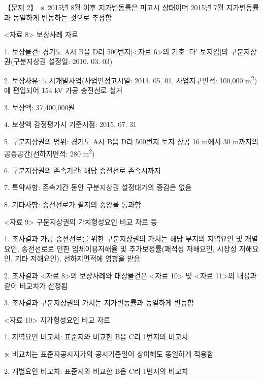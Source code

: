 \begin{longquestion}{【문제 2】}
※ 2015년 8월 이후 지가변동률은 미고시 상태이며 2015년 7월 지가변동률과 동일하게 변동하는 것으로 추정함 \par
<자료 8> 보상사례 자료 \par
1. 보상물건: 경기도 A시 B읍 D리 500번지[<자료 6>의 기호 ‘다’ 토지임]의 구분지상권(구분지상권 설정일: 2010. 03. 03) \par
2. 보상사유: 도시개발사업(사업인정고시일: 2013. 05. 01, 사업지구면적: 100,000 m\textsuperscript{2})에 편입되어 154 kV 가공 송전선로 철거 \par
3. 보상액: 37,400,000원 \par
4. 보상액 감정평가시 기준시점: 2015. 07. 31 \par
5. 구분지상권의 범위: 경기도 A시 B읍 D리 500번지 토지 상공 16 m에서 30 m까지의 공중공간(선하지면적: 280 m\textsuperscript{2}) \par
6. 구분지상권의 존속기간: 해당 송전선로 존속시까지 \par
7. 특약사항: 존속기간 동안 구분지상권 설정대가의 증감은 없음 \par
8. 기타사항: 송전선로가 필지의 중앙을 통과함 \par
<자료 9> 구분지상권의 가치형성요인 비교 자료 등 \par
1. 조사결과 가공 송전선로를 위한 구분지상권의 가치는 해당 부지의 지역요인 및 개별요인, 송전선로로 인한 입체이용저해율 및 추가보정률(쾌적성 저해요인, 시장성 저해요인, 기타 저해요인), 선하지면적에 영향을 받음 \par
2. 조사결과 <자료 8>의 보상사례와 대상물건은 <자료 10> 및 <자료 11>의 내용과 같이 비교치가 산정됨 \par
3. 조사결과 구분지상권의 가치는 지가변동률과 동일하게 변동함 \par
<자료 10> 지가형성요인 비교 자료 \par
1. 지역요인 비교치: 표준지와 비교한 B읍 C리 1번지의 비교치 \par
{\small\centering
{}\par}

※ 비교치는 표준지공시지가의 공시기준일이 상이해도 동일하게 적용함 \par
2. 개별요인 비교치: 표준지와 비교한 B읍 C리 1번지의 비교치 \par
{\small\centering
{}\par}


\end{longquestion}
